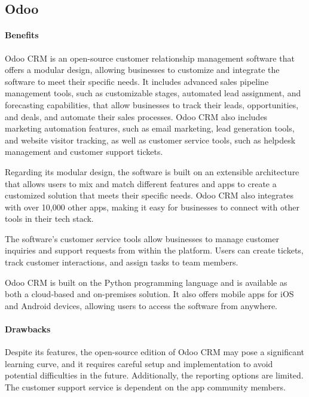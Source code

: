 \documentclass{article}
\begin{document}
\subsection{Odoo}

\paragraph{Benefits}

Odoo CRM is an open-source customer relationship management software that offers a modular design, allowing businesses to customize and integrate the software to meet their specific needs. It includes advanced sales pipeline management tools, such as customizable stages, automated lead assignment, and forecasting capabilities, that allow businesses to track their leads, opportunities, and deals, and automate their sales processes. Odoo CRM also includes marketing automation features, such as email marketing, lead generation tools, and website visitor tracking, as well as customer service tools, such as helpdesk management and customer support tickets.

Regarding its modular design, the software is built on an extensible architecture that allows users to mix and match different features and apps to create a customized solution that meets their specific needs. Odoo CRM also integrates with over 10,000 other apps, making it easy for businesses to connect with other tools in their tech stack.

The software's customer service tools allow businesses to manage customer inquiries and support requests from within the platform. Users can create tickets, track customer interactions, and assign tasks to team members.

Odoo CRM is built on the Python programming language and is available as both a cloud-based and on-premises solution. It also offers mobile apps for iOS and Android devices, allowing users to access the software from anywhere.

\paragraph{Drawbacks}

Despite its features, the open-source edition of Odoo CRM may pose a significant learning curve, and it requires careful setup and implementation to avoid potential difficulties in the future. Additionally, the reporting options are limited. The customer support service is dependent on the app community members.
\end{document}
